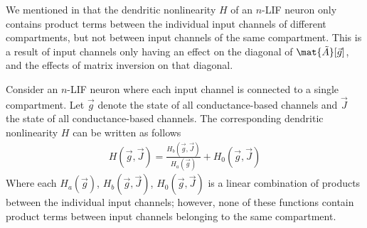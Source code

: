 We mentioned in  that the dendritic nonlinearity $H$ of an $n$-LIF neuron only contains product terms between the individual input channels of different compartments, but not between input channels of the same compartment.
This is a result of input channels only having an effect on the diagonal of $\mat{\tilde A}[\vec g]$, and the effects of matrix inversion on that diagonal.

%

\begin{theorem}
Consider an $n$-LIF neuron where each input channel is connected to a single compartment.
Let $\vec g$ denote the state of all conductance-based channels and $\vec J$ the state of all conductance-based channels.
The corresponding dendritic nonlinearity $H$ can be written as follows
\begin{align*}
	H(\vec g, \vec J) = \frac{H_b(\vec g, \vec J)}{H_a(\vec g)} + H_0(\vec g, \vec J)
\end{align*}
Where each $H_a(\vec g)$, $H_b(\vec g, \vec J)$, $H_0(\vec g, \vec J)$ is a linear combination of products between the individual input channels; however, none of these functions contain product terms between input channels belonging to the same compartment.
\end{theorem}

